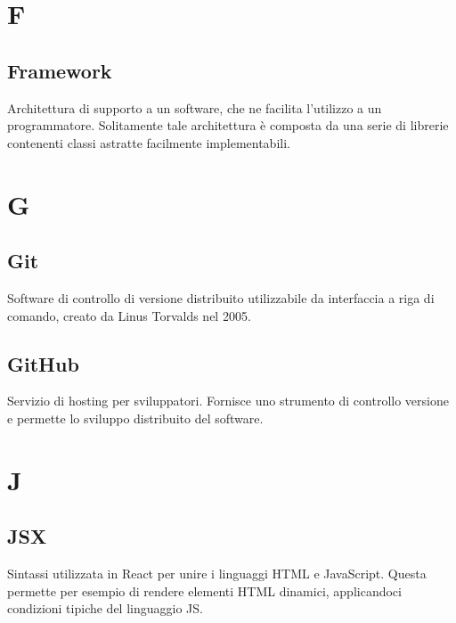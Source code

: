 \section*{F}
\subsection*{Framework}
Architettura di supporto a un software, che ne facilita l'utilizzo a un programmatore. Solitamente tale architettura è composta da una serie di librerie contenenti classi astratte facilmente implementabili.

\section*{G}
\subsection*{Git}
Software di controllo di versione distribuito utilizzabile da interfaccia a riga di comando, creato da Linus Torvalds nel 2005. 
\subsection*{GitHub}
Servizio di hosting per sviluppatori. Fornisce uno strumento di controllo versione e permette lo sviluppo distribuito del software.


\section*{J}
\subsection*{JSX}
Sintassi utilizzata in React per unire i linguaggi HTML e JavaScript. Questa permette per esempio di rendere elementi HTML dinamici, applicandoci condizioni tipiche del linguaggio JS. 



